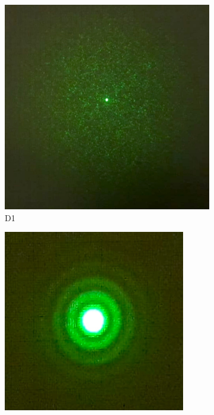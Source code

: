 \begin{figure}[H]
    \centering

    \begin{subfigure}[t]{.3\textwidth}
        \centering
        \includegraphics[width=\textwidth]{figuras/medidas/D1.jpg}
        \caption{D1}
        \label{fig:D1}
    \end{subfigure}
    \qquad
    \begin{subfigure}[t]{.3\textwidth}
        \centering
        \includegraphics[width=\textwidth]{figuras/medidas/D2.jpg}

\end{subfigure}
\end{figure}
